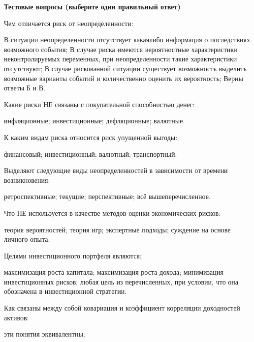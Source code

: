 \documentclass[12pt, table]{exam}
\begin{document}
\pagebreak
\noindent\textbf{Тестовые вопросы (выберите один правильный ответ)}

\begin{questions}
\begin{multicols}{2}
\setlength{\columnsep}{1cm}

\question Чем отличается риск от неопределенности:
	 \begin{choices}
	 \CC В ситуации неопределенности отсутствует какаялибо информация о последствиях возможного события;
	 \choice В случае риска имеются вероятностные характеристики неконтролируемых переменных, при неопределенности такие характеристики отсутствуют;
	 \choice В случае рискованной ситуации существует возможность выделить возможные варианты событий и количественно оценить их вероятность;
	 \choice Верны ответы Б и В.
	 \end{choices}
\question Какие риски НЕ связаны с покупательной способностью денег:
	 \begin{choices}
	 \choice инфляционные;
	 \choice инвестиционные;
	 \CC дефляционные;
	 \choice валютные.
	 \end{choices}
\question К каким видам риска относится риск упущенной выгоды:
	 \begin{choices}
	 \choice финансовый;
	 \choice инвестиционный;
	 \choice валютный;
	 \CC транспортный.
	 \end{choices}
\question Выделяют следующие виды неопределенностей в зависимости от времени возникновения:
	 \begin{choices}
	 \choice ретроспективные;
	 \CC текущие;
	 \choice перспективные;
	 \choice всё вышеперечисленное.
	 \end{choices}
\question Что НЕ используется в качестве методов оценки экономических рисков:
	 \begin{choices}
	 \CC теория вероятностей;
	 \choice теория игр;
	 \choice экспертные подходы;
	 \choice суждение на основе личного опыта.
	 \end{choices}
\question Целями инвестиционного портфеля являются:
	 \begin{choices}
	 \choice максимизация роста капитала;
	 \CC максимизация роста дохода;
	 \choice минимизация инвестиционных рисков;
	 \choice любая цель из перечисленных, при условии, что она обозначена в инвестиционной стратегии.
	 \end{choices}
\question Как связаны между собой ковариация и коэффициент корреляции доходностей активов:
	 \begin{choices}
	 \choice эти понятия эквивалентны;

\end{choices}
\end{multicols}
\end{questions}
\end{document}
